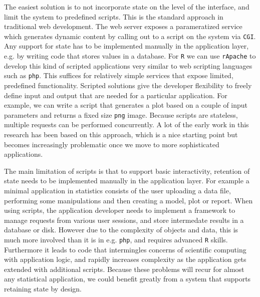 \documentclass{article}
\newcommand{\CGI}{\texttt{CGI}\xspace}
\newcommand{\R}{\texttt{R}\xspace}
\begin{document}
The easiest solution is to not incorporate state on the level of the interface, and limit the system to predefined scripts. This is the standard approach in traditional web development. The web server exposes a parameratized service which generates dynamic content by calling out to a script on the system via \CGI. Any support for state has to be implemented manually in the application layer, e.g. by writing code that stores values in a database. For \R we can use \texttt{rApache} \citep{horner2013rapache} to develop this kind of scripted applications very similar to web scripting languages such as \texttt{php}. This suffices for relatively simple services that expose limited, predefined functionality. Scripted solutions give the developer flexibility to freely define input and output that are needed for a particular application. For example, we can write a script that generates a plot based on a couple of input parameters and returns a fixed size \texttt{png} image. Because scripts are stateless, multiple requests can be performed concurrently. A lot of the early work in this research has been based on this approach, which is a nice starting point but becomes increasingly problematic once we move to more sophisticated applications.

The main limitation of scripts is that to support basic interactivity, retention of state needs to be implemented manually in the application layer. For example a minimal application in statistics consists of the user uploading a data file, performing some manipulations and then creating a model, plot or report. When using scripts, the application developer needs to implement a framework to manage requests from various user sessions, and store intermedate results in a database or disk. However due to the complexity of objects and data, this is much more involved than it is in e.g. \texttt{php}, and requires advanced \R skills. Furthermore it leads to code that intermingles concerns of scientific computing with application logic, and rapidly increases complexity as the application gets extended with additional scripts.
Because these problems will recur for almost any statistical application, we could benefit greatly from a system that supports retaining state by design.
\end{document}
